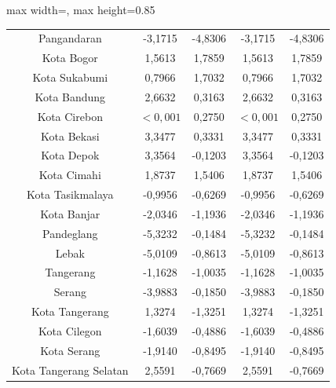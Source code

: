 \begin{table}[H]
\begin{adjustbox}{max width=\textwidth, max height=0.85\textheight}
\begin{tabular}{|c|c|c|c|c|}
Pangandaran & -3,1715 & -4,8306 & -3,1715 & -4,8306 \\
Kota Bogor & 1,5613 & 1,7859 & 1,5613 & 1,7859 \\
Kota Sukabumi & 0,7966 & 1,7032 & 0,7966 & 1,7032 \\
Kota Bandung & 2,6632 & 0,3163 & 2,6632 & 0,3163 \\
Kota Cirebon & $< 0,001$ & 0,2750 & $< 0,001$ & 0,2750 \\
Kota Bekasi & 3,3477 & 0,3331 & 3,3477 & 0,3331 \\
Kota Depok & 3,3564 & -0,1203 & 3,3564 & -0,1203 \\
Kota Cimahi & 1,8737 & 1,5406 & 1,8737 & 1,5406 \\
Kota Tasikmalaya & -0,9956 & -0,6269 & -0,9956 & -0,6269 \\
Kota Banjar & -2,0346 & -1,1936 & -2,0346 & -1,1936 \\
Pandeglang & -5,3232 & -0,1484 & -5,3232 & -0,1484 \\
Lebak & -5,0109 & -0,8613 & -5,0109 & -0,8613 \\
Tangerang & -1,1628 & -1,0035 & -1,1628 & -1,0035 \\
Serang & -3,9883 & -0,1850 & -3,9883 & -0,1850 \\
Kota Tangerang & 1,3274 & -1,3251 & 1,3274 & -1,3251 \\
Kota Cilegon & -1,6039 & -0,4886 & -1,6039 & -0,4886 \\
Kota Serang & -1,9140 & -0,8495 & -1,9140 & -0,8495 \\
Kota Tangerang Selatan & 2,5591 & -0,7669 & 2,5591 & -0,7669 \\
\hline
\end{tabular}
\end{adjustbox}
\end{table}